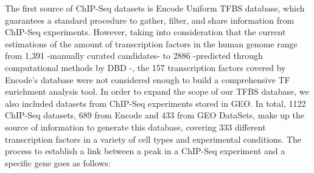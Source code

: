 \documentclass[a4paper, 12pt ]{article}
\begin{document}
The first source of ChIP-Seq datasets is Encode Uniform TFBS database, which guarantees a standard procedure to gather, filter, and share information from ChIP-Seq experiments. However, taking into consideration that the current estimations of the amount of transcription factors in the human genome range from 1,391\cite{TFcensus} -manually curated candidates- to 2886 -predicted through computational methods by DBD\cite{DBD1}\cite{DBD2} -, the 157 transcription factors covered by Encode’s database were not considered enough to build a comprehensive TF enrichment analysis tool.
In order to expand the scope of our TFBS database, we also included datasets from ChIP-Seq experiments stored in GEO. In total, 1122 ChIP-Seq datasets, 689 from Encode and 433 from GEO DataSets, make up the source of information to generate this database, covering 333 different transcription factors in a variety of cell types and experimental conditions.
The process to establish a link between a peak in a ChIP-Seq experiment and a specific gene goes as follows:
\end{document}

